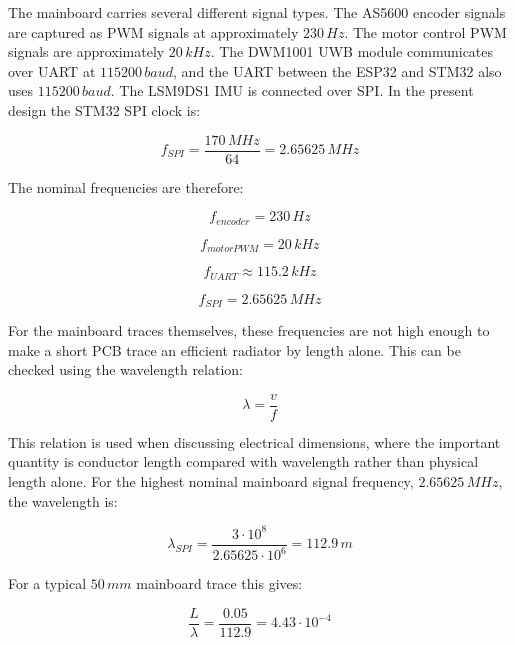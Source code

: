 The mainboard carries several different signal types. The AS5600 encoder signals are
captured as PWM signals at approximately \(230\,Hz\). The motor control PWM signals are
approximately \(20\,kHz\). The DWM1001 UWB module communicates over UART at
\(115200\,baud\), and the UART between the ESP32 and STM32 also uses \(115200\,baud\).
The LSM9DS1 IMU is connected over SPI. In the present design the STM32 SPI clock is:

\begin{equation}
f_{SPI} = \frac{170\,MHz}{64} = 2.65625\,MHz
\end{equation}

The nominal frequencies are therefore:

\begin{equation}
f_{encoder} = 230\,Hz
\end{equation}

\begin{equation}
f_{motorPWM} = 20\,kHz
\end{equation}

\begin{equation}
f_{UART} \approx 115.2\,kHz
\end{equation}

\begin{equation}
f_{SPI} = 2.65625\,MHz
\end{equation}

For the mainboard traces themselves, these frequencies are not high enough to make a
short PCB trace an efficient radiator by length alone. This can be checked using the
wavelength relation:

\begin{equation}
\lambda = \frac{v}{f}
\end{equation}

This relation is used when discussing electrical dimensions, where the
important quantity is conductor length compared with wavelength rather than physical
length alone. For the highest nominal mainboard signal frequency,
\(2.65625\,MHz\), the wavelength is:

\begin{equation}
\lambda_{SPI} =
\frac{3 \cdot 10^8}{2.65625 \cdot 10^6}
= 112.9\,m
\end{equation}

For a typical \(50\,mm\) mainboard trace this gives:

\begin{equation}
\frac{L}{\lambda} =
\frac{0.05}{112.9}
= 4.43 \cdot 10^{-4}
\end{equation}

